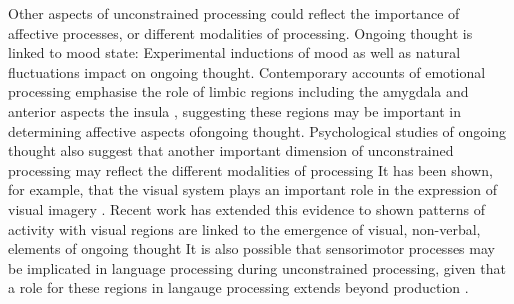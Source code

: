 Other aspects of unconstrained processing could reflect the importance of affective processes, or different modalities of processing. Ongoing thought is linked to mood state: Experimental inductions of mood \cite{Smallwood2009a,Smallwood2011}
as well as natural fluctuations \cite{Poerio2013, Ruby2013a}
impact on ongoing thought. Contemporary accounts of emotional processing emphasise the role of limbic regions including the amygdala \cite{Bzdok2013,Lindquist2012}%
and anterior aspects the insula \cite{Touroutoglou2012},%
suggesting these regions may be important in determining affective aspects ofongoing thought. Psychological studies of ongoing thought also suggest that another important dimension of unconstrained processing may reflect the different modalities of processing \cite{Konishi2017,Smallwood2016}%
It has been shown, for example, that the visual system plays an important role in the expression of visual imagery \cite{Ganis2004,Kosslyn2001}.%
Recent work has extended this evidence to shown patterns of activity with visual regions are linked to the emergence of visual, non-verbal, elements of ongoing thought \cite{Raij2017}%
It is also possible that sensorimotor processes may be implicated in language processing during unconstrained processing, given that a role for these regions in langauge processing extends beyond production \cite{Bzdok2016,Pulvermueller2010,Pulvermueller2010a}.

